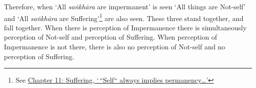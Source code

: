 Therefore, when `All \emph{saṅkhāra} are impermanent' is seen `All things are Not-self' and `All \emph{saṅkhāra} are Suffering'\footnote{See \href{ch-11-suffering.xml\#impermanent}{Chapter 11: Suffering, `\,``Self`` always implies permanency\ldots\hspace{0pt}'}} are also seen. These three stand together, and fall together. When there is perception of Impermanence there is simultaneously perception of Not-self and perception of Suffering. When perception of Impermanence is not there, there is also no perception of Not-self and no perception of Suffering.
